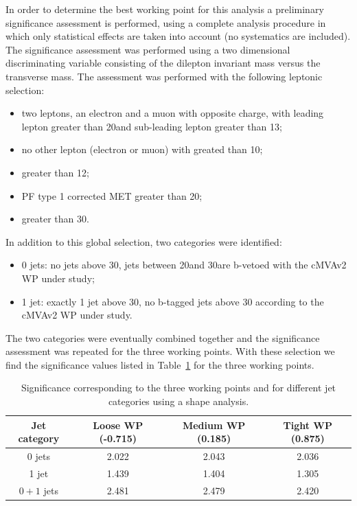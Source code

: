 In order to determine the best working point for this analysis a preliminary significance assessment is performed, using a complete analysis procedure in which only statistical
effects are taken into account (no systematics are included). The significance assessment
was performed using a two dimensional discriminating
variable consisting of the dilepton invariant mass versus the transverse
mass. The assessment was performed with the following leptonic selection:
\begin{itemize}
\item two leptons, an electron and a muon with opposite charge, with
leading lepton \pt greater than 20\GeV and sub-leading lepton \pt greater than
13\GeV;
\item no other lepton (electron or muon) with \pt greated than 10\GeV;
\item \mll greater than 12\GeV;
\item PF type 1 corrected MET greater than 20\GeV;
\item \ptll greater than 30\GeV.
\end{itemize}
In addition to this global selection, two categories were identified:
\begin{itemize}
\item 0 jets: no jets above 30\GeV, jets between 20\GeV and 30\GeV are
b-vetoed with the cMVAv2 WP under study;
\item 1 jet: exactly 1 jet above 30\GeV, no b-tagged jets above 30\GeV
according to the cMVAv2 WP under study.
\end{itemize}
The two categories were eventually combined together and the significance 
assessment was repeated for the three working points.
With these selection we find the significance values listed in
Table~\ref{tab:significance_wp_combine} for the three working points.
\begin{table}
\begin{center}
\begin{tabular}{cccc}
\toprule
Jet category & Loose WP (-0.715) & Medium WP (0.185) & Tight WP (0.875) \\
\midrule
0 jets & 2.022 & 2.043 & 2.036 \\
1 jet & 1.439 & 1.404 & 1.305 \\
$0+1$ jets & 2.481 & 2.479 & 2.420 \\
\bottomrule
\end{tabular}
\end{center}
\caption{Significance corresponding to the three working points and for
different jet categories using a shape
analysis.\label{tab:significance_wp_combine}}
\end{table}

